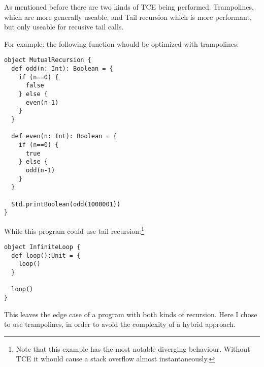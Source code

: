 As mentioned before there are two kinds of TCE being performed. Trampolines, which are more generally useable, and Tail recursion which is more performant, but only useable for recusive tail calls.

For example: the following function whould be optimized with trampolines:
\begin{lstlisting}
object MutualRecursion {
  def odd(n: Int): Boolean = {
    if (n==0) {
      false
    } else {
      even(n-1)
    }
  }

  def even(n: Int): Boolean = {
    if (n==0) {
      true
    } else {
      odd(n-1)
    }
  }

  Std.printBoolean(odd(1000001))
}
\end{lstlisting}

While this program could use tail recursion:\footnote{Note that this example has the most notable diverging behaviour. Without TCE it whould cause a stack overflow almost instantaneously.}

\begin{lstlisting}
object InfiniteLoop {
  def loop():Unit = {
    loop()
  }

  loop()
}
\end{lstlisting}


This leaves the edge case of a program with both kinds of recursion. Here I chose to use trampolines, in order to avoid the complexity of a hybrid approach.